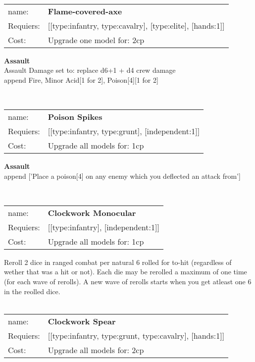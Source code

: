 \ \\
\begin{tabular}{ll}
name: & {\bf Flame-covered-axe } \\
Requiers: & [[type:infantry, type:cavalry], [type:elite], [hands:1]] \\
Cost: & Upgrade one model for: 2cp \\
\end{tabular}





{\bf Assault} \ \\
Assault Damage set to: replace d6+1 + d4 crew damage
\\ 

append Fire, Minor Acid[1 for 2], Poison[4][1 for 2]


\ \\
\begin{tabular}{ll}
name: & {\bf Poison Spikes } \\
Requiers: & [[type:infantry, type:grunt], [independent:1]] \\
Cost: & Upgrade all models for: 1cp \\
\end{tabular}





{\bf Assault} \ \\

append ['Place a poison[4] on any enemy which you deflected an attack from']


\ \\
\begin{tabular}{ll}
name: & {\bf Clockwork Monocular } \\
Requiers: & [[type:infantry], [independent:1]] \\
Cost: & Upgrade all models for: 1cp \\
\end{tabular}

Reroll 2 dice in ranged combat per natural 6 rolled for to-hit (regardless of wether that was a hit or not). Each die may be rerolled a maximum of one time (for each wave of rerolls). A new wave of rerolls starts when you get atleast one 6 in the reolled dice.\\ 









\ \\
\begin{tabular}{ll}
name: & {\bf Clockwork Spear } \\
Requiers: & [[type:infantry, type:grunt, type:cavalry], [hands:1]] \\
Cost: & Upgrade all models for: 2cp \\
\end{tabular}





